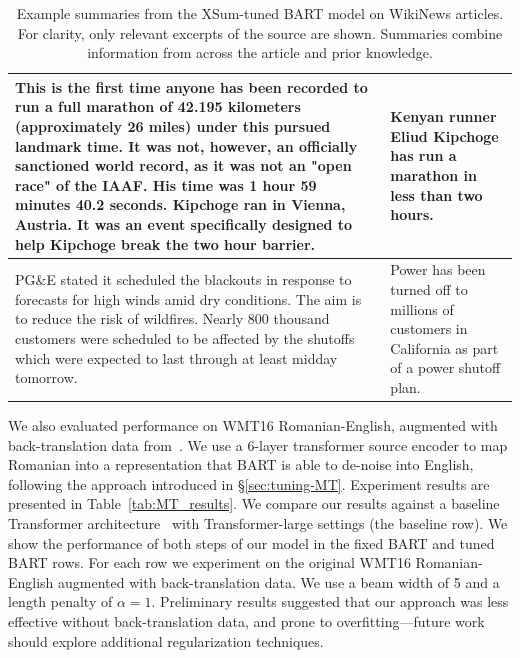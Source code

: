 \documentclass{article} %
\newcommand{\todo}[1]{{\color{red} #1}}
\begin{document}
\begin{table}[ht]
\begin{tabular}{p{9cm}p{6cm}}
\midrule
This is the first time anyone has been recorded to run a full marathon of 42.195 kilometers (approximately 26 miles) under this pursued landmark time. It was not, however, an officially sanctioned world record, as it was not an "open race" of the IAAF. His time was 1 hour 59 minutes 40.2 seconds. Kipchoge ran in Vienna, Austria. It was an event specifically designed to help Kipchoge break the two hour barrier. & Kenyan runner Eliud Kipchoge has run a marathon in less than two hours.\\
\midrule
PG\&E stated it scheduled the blackouts in response to forecasts for high winds amid dry conditions. The aim is to reduce the risk of wildfires. Nearly 800 thousand customers were scheduled to be affected by the shutoffs which were expected to last through at least midday tomorrow. & Power has been turned off to millions of customers in California as part of a power shutoff plan.\\
\bottomrule
\end{tabular}
\caption{\label{table:xsum_samples} Example summaries from the XSum-tuned BART model on WikiNews articles. For clarity, only relevant excerpts of the source are shown. Summaries combine information from across the article and prior knowledge. 
}
\end{table}
 
 We also evaluated performance on WMT16 Romanian-English, augmented with back-translation data from~\citet{sennrich2016}. We use a 6-layer transformer source encoder to map Romanian into a representation that BART is able to de-noise into English, following the approach introduced in \S\ref{sec:tuning-MT}.
 Experiment results are presented in Table~\ref{tab:MT_results}. We compare our results against a baseline Transformer architecture~\cite{vaswani:2017} with Transformer-large settings (the baseline row). We show the performance of both steps of our model in the fixed BART and tuned BART rows. For each row we experiment on the original WMT16 Romanian-English augmented with back-translation data. We use a beam width of 5 and a length penalty of $\alpha = 1$.
 Preliminary results suggested that our approach was less effective without back-translation data, and prone to overfitting---future work should explore additional regularization techniques.
 
\end{document}
